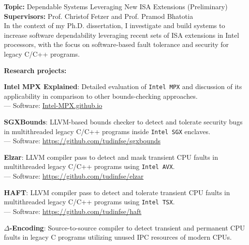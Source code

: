 \documentclass[letterpaper]{article}
\renewenvironment{itemize}{
  \begin{list}{}{
    \setlength{\leftmargin}{1.5em}
  }
}{
  \end{list}
}
\begin{document}
\begin{itemize}
\item {\bf Topic:} Dependable Systems Leveraging New ISA Extensions (Preliminary)\\
{\bf Supervisors:} Prof. Christof Fetzer and Prof. Pramod Bhatotia\vspace{-13pt}\\

In the context of my Ph.D. dissertation, I investigate and build systems to increase software dependability leveraging recent sets of ISA extensions in Intel processors, with the focus on software-based fault tolerance and security for legacy C/C++ programs. %

{\bf Research projects:}
	\begin{itemize}%
	
		\item  {\bf Intel MPX Explained}: Detailed evaluation of {\tt Intel MPX} and discussion of its applicability in comparison to other bounds-checking approaches.\\
			--- Software: \href{https://intel-mpx.github.io/}{Intel-MPX.github.io}
		
		\item {\bf SGXBounds}: LLVM-based bounds checker to detect and tolerate security bugs in multithreaded legacy C/C++ programs inside {\tt Intel SGX} enclaves.\\
			--- Software: \href{https://github.com/tudinfse/sgxbounds}{https://github.com/tudinfse/sgxbounds}
			
			
		\item {\bf Elzar}: LLVM compiler pass to detect and mask transient CPU faults in multithreaded legacy C/C++ programs using {\tt Intel AVX}.\\
		 --- Software: \href{https://github.com/tudinfse/elzar}{https://github.com/tudinfse/elzar}
		 
		\item {\bf HAFT}: LLVM compiler pass to detect and tolerate transient CPU faults in multithreaded legacy C/C++ programs using {\tt Intel TSX}.\\
				--- Software: \href{https://github.com/tudinfse/haft}{https://github.com/tudinfse/haft}
				
		\item {\bf $\Delta$-Encoding}: Source-to-source compiler to detect transient and permanent CPU faults in legacy C programs utilizing unused IPC resources of modern CPUs.
	\end{itemize}%
\end{itemize}%
\end{document}

